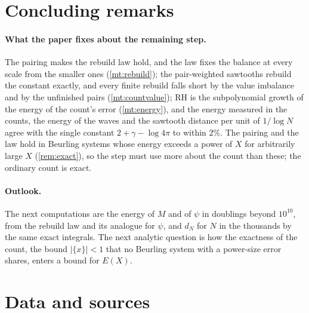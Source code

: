\documentclass[11pt]{article}
\theoremstyle{definition}\newtheorem{definition}[theorem]{Definition}
\theoremstyle{remark}\newtheorem{remark}[theorem]{Remark}
\newcommand{\fr}[1]{\{#1\}}
\begin{document}
\section{Concluding remarks}\label{sec:concl}

\paragraph{What the paper fixes about the remaining step.} The pairing makes the rebuild law hold, and the law fixes the balance at every scale from the smaller ones (\cref{mt:rebuild}); the pair-weighted sawtooths rebuild the constant exactly, and every finite rebuild falls short by the value imbalance and by the unfinished pairs (\cref{mt:countvalue}); RH is the subpolynomial growth of the energy of the count's error (\cref{mt:energy}), and the energy measured in the counts, the energy of the waves and the sawtooth distance per unit of $1/\log N$ agree with the single constant $2+\gamma-\log4\pi$ to within $2\%$. The pairing and the law hold in Beurling systems whose energy exceeds a power of $X$ for arbitrarily large $X$ (\cref{rem:exact}), so the step must use more about the count than these; the ordinary count is exact.

\paragraph{Outlook.} The next computations are the energy of $M$ and of $\psi$ in doublings beyond $10^{10}$, from the rebuild law and its analogue for $\psi$, and $d_N$ for $N$ in the thousands by the same exact integrals. The next analytic question is how the exactness of the count, the bound $|\fr x|<1$ that no Beurling system with a power-size error shares, enters a bound for $E(X)$.

\section{Data and sources}\label{sec:data}
\end{document}
